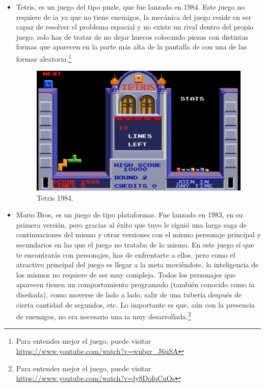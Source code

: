 \begin{itemize}
	\item Tetris, es un juego del tipo puzle, que fue lanzado en 1984. Este juego no requiere de \gls{ia} ya que no tiene enemigos, la mecánica del juego reside en ser capaz de resolver el problema espacial y no existe un rival dentro del propio juego, solo has de tratar de no dejar huecos colocando piezas con distintas formas que aparecen en la parte más alta de la pantalla de con una de las formas aleatoria.\footnote{Para entender mejor el juego, puede visitar \url{https://www.youtube.com/watch?v=wnber_J6uSA}}
	\begin{figure}[h]
		\centering
		\includegraphics[width=15cm]{archivos/imagenes/tetris-1984.png}
		\caption{Tetris 1984.}
	\end{figure}
	\item Mario Bros, es un juego de tipo plataformas. Fue lanzado en 1983, en su primera versión, pero gracias al éxito que tuvo le siguió una larga saga de continuaciones del mismo y otras versiones con el mismo personaje principal y secundarios en las que el juego no trataba de lo mismo. En este juego sí que te encontrarás con personajes, has de enfrentarte a ellos, pero como el atractivo principal del juego es llegar a la meta moviéndote, la inteligencia de los mismos no requiere de ser muy compleja. Todos los personajes que aparecen tienen un comportamiento programado (también conocido como \gls{ia} diseñada), como moverse de lado a lado, salir de una tubería después de cierta cantidad de segundos, etc. Lo importante es que, aún con la presencia de enemigos, no era necesario una \gls{ia} muy desarrollada.\footnote{Para entender mejor el juego, puede visitar \url{https://www.youtube.com/watch?v=ly8DofqCuOs}}
	\begin{figure}[h]
		\centering

\end{figure}
\end{itemize}
